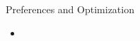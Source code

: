 \begin{frame}{Preferences and Optimization}
  \begin{itemize}
  \item
  \end{itemize}
\end{frame}
%
